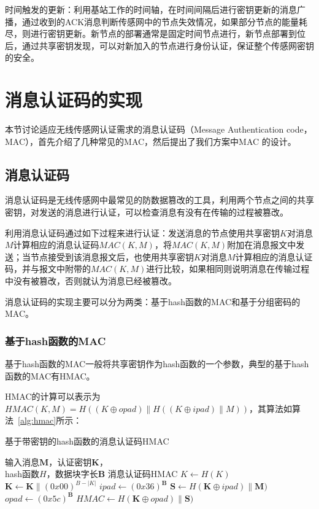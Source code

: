 时间触发的更新：利用基站工作的时间轴，在时间间隔后进行密钥更新的消息广播，通过收到的ACK消息判断传感网中的节点失效情况，如果部分节点的能量耗尽，则进行密钥更新。新节点的部署通常是固定时间节点进行，新节点部署到位后，通过共享密钥发现，可以对新加入的节点进行身份认证，保证整个传感网密钥的安全。


\section{消息认证码的实现}
本节讨论适应无线传感网认证需求的消息认证码（Message Authentication code，MAC），首先介绍了几种常见的MAC，然后提出了我们方案中MAC 的设计。

\subsection{消息认证码}
消息认证码是无线传感网中最常见的防数据篡改的工具，利用两个节点之间的共享密钥，对发送的消息进行认证，可以检查消息有没有在传输的过程被篡改。

利用消息认证码通过如下过程来进行认证：发送消息的节点使用共享密钥$K$对消息$M$计算相应的消息认证码$MAC(K,M)$，将$MAC(K,M)$附加在消息报文中发送；当节点接受到该消息报文后，也使用共享密钥$K$对消息$M$计算相应的消息认证码，并与报文中附带的$MAC(K,M)$进行比较，如果相同则说明消息在传输过程中没有被篡改，否则就认为消息已经被篡改。

消息认证码的实现主要可以分为两类：基于hash函数的MAC和基于分组密码的MAC。
\subsubsection{基于hash函数的MAC}
基于hash函数的MAC一般将共享密钥作为hash函数的一个参数，典型的基于hash函数的MAC有HMAC。

HMAC的计算可以表示为$HMAC(K,M)=H((K \oplus opad)\| H((K\oplus ipad)\| M))$，其算法如算法~\ref{alg:hmac}所示：
\begin{algorithm}[htbp]
  \caption{基于带密钥的hash函数的消息认证码HMAC}
  \label{alg:hmac}
  \begin{algorithmic}[1]
    \REQUIRE 输入消息$\mathbf{M}$，认证密钥$\mathbf{K}$，\\
            hash函数$H$，数据块字长$\mathbf{B}$
    \ENSURE 消息认证码HMAC
        \STATE $K \leftarrow H(K)$
    \ENDIF
    \STATE $\mathbf{K} \leftarrow \mathbf{K}\| (0x00)^{B-|K|}$
    \STATE $ipad \leftarrow (0x36)^\mathbf{B}$
    \STATE $\mathbf{S} \leftarrow H(\mathbf{K}\oplus ipad)\| \mathbf{M})$
    \STATE $opad \leftarrow (0x5c)^\mathbf{B}$
    \STATE $HMAC \leftarrow H(\mathbf{K}\oplus opad)\| \mathbf{S})$
  \end{algorithmic}
\end{algorithm}

